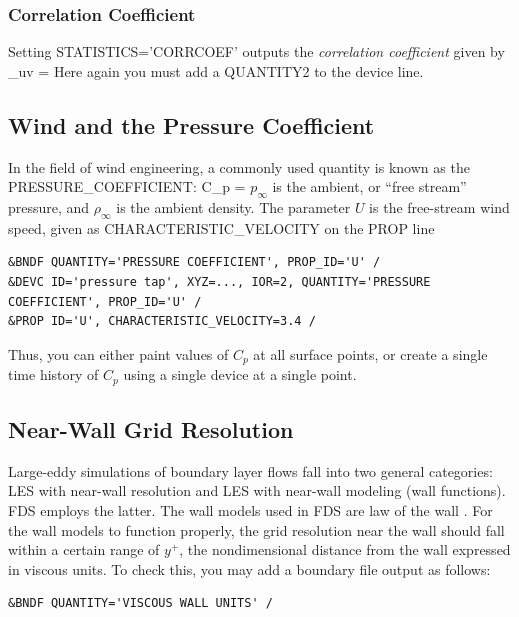 \documentclass[11pt]{book}
\begin{document}
\subsubsection{Correlation Coefficient}
\label{info:corrcoef}

Setting {\ct STATISTICS='CORRCOEF'} outputs the \emph{correlation coefficient} given by
\be
   \rho_{uv} = 
\ee
Here again you must add a {\ct QUANTITY2} to the device line.

\subsection{Wind and the Pressure Coefficient}
\label{info:pressure_coefficient}

In the field of wind engineering, a commonly used quantity is known as
the {\ct PRESSURE\_COEFFICIENT}:
\be
   C_p = 
\ee
$p_\infty$ is the ambient, or ``free stream'' pressure, and
$\rho_\infty$ is the ambient density.  The parameter $U$ is the
free-stream wind speed, given as {\ct CHARACTERISTIC\_VELOCITY} on the
{\ct PROP} line

\begin{lstlisting}
&BNDF QUANTITY='PRESSURE COEFFICIENT', PROP_ID='U' /
&DEVC ID='pressure tap', XYZ=..., IOR=2, QUANTITY='PRESSURE COEFFICIENT', PROP_ID='U' /
&PROP ID='U', CHARACTERISTIC_VELOCITY=3.4 /
\end{lstlisting}

\noindent
Thus, you can either paint values of $C_p$ at all surface points, or create a single time history of $C_p$ using a single device at a single point.

\subsection{Near-Wall Grid Resolution}
\label{info:yplus}

Large-eddy simulations of boundary layer flows fall into two general categories: LES with near-wall resolution and LES with near-wall modeling (wall functions).  FDS employs the latter.  The wall models used in FDS are law of the wall \cite{Pope:2000}.  For the wall models to function properly, the grid resolution near the wall should fall within a certain range of $y^+$, the nondimensional distance from the wall expressed in viscous units.  To check this, you may add a boundary file output as follows:

\begin{lstlisting}
&BNDF QUANTITY='VISCOUS WALL UNITS' /
\end{lstlisting}
\end{document}
